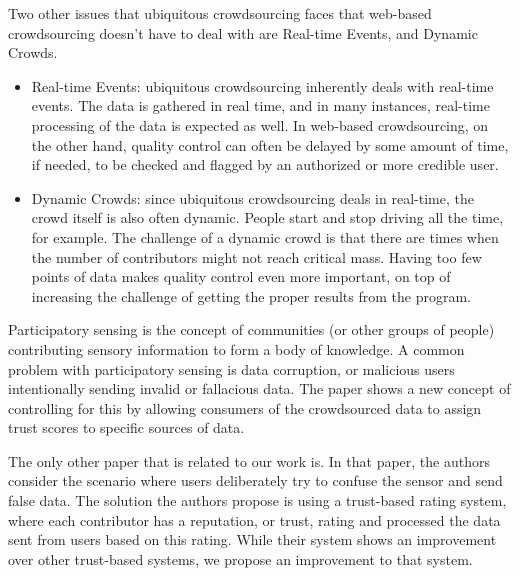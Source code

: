 \documentclass[9pt,twocolumn]{article}
\begin{document}
	Two other issues that ubiquitous crowdsourcing faces that web-based crowdsourcing doesn't have to deal with are Real-time Events, and Dynamic Crowds.
	\begin{itemize}
		\item Real-time Events: ubiquitous crowdsourcing inherently deals with real-time events. The data is gathered in real time, and in many instances, real-time processing of the data is expected as well. %
		In web-based crowdsourcing, on the other hand, quality control can often be delayed by some amount of time, if needed, to be checked and flagged by an authorized or more credible user. 
		
		\item Dynamic Crowds: since ubiquitous crowdsourcing deals in real-time, the crowd itself is also often dynamic. People start and stop driving all the time, for example. The challenge of a dynamic crowd is that there are times when the number of contributors might not reach critical mass. Having too few points of data makes quality control even more important, on top of increasing the challenge of getting the proper results from the program.
	\end{itemize}
	
	Participatory sensing is the concept of communities (or other groups of people) contributing sensory information to form a body of knowledge. \cite{wilsondefinition}
	A common problem with participatory sensing is data corruption, or malicious users intentionally sending invalid or fallacious data. The paper \cite{reddy2009mobisense} shows a new concept of controlling for this by allowing consumers of the crowdsourced data to assign trust scores to specific sources of data. 
	
	The only other paper that is related to our work is. \cite{huang2010you}
	In that paper, the authors consider the scenario where users deliberately try to confuse the sensor and send false data. The solution the authors propose is using a trust-based rating system, where each contributor has a reputation, or trust, rating and processed the data sent from users based on this rating. While their system shows an improvement over other trust-based systems, we propose an improvement to that system.
	
	
\end{document}
